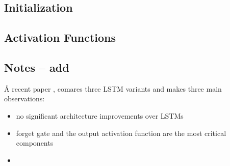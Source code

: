 \subsection{Initialization}

\subsection{Activation Functions}

\subsection{Notes -- add}

\r{A recent paper , comares three LSTM variants and makes three main observations:}

\begin{itemize}[noitemsep,topsep=0pt]
	\item no significant architecture improvements over LSTMs
	\item forget gate and the output activation function are the most critical components
	\item {}
\end{itemize}










